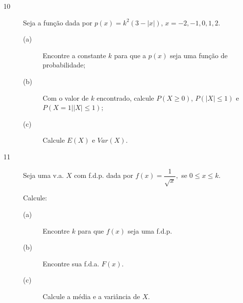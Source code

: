 \documentclass{report}
\begin{document}
\begin{description}

\item[{\large 10}] Seja a função dada por  $p(x)=k^{2}(3-|x|)$, $x = -2, -1, 0, 1, 2.$


\begin{description}

\item[(a)]  Encontre a constante $k$ para que a $p(x)$ seja uma função de probabilidade;

\item[(b)]  Com o valor de $k$ encontrado, calcule   $P(X\geq 0)$, $P(|X|\leq 1)$ e $P(X=1||X|\leq 1)$;

\item[(c)]  Calcule $E(X)$ e $Var(X)$.


\end{description}

\end{description}


\begin{description}

\item[{\large 11}] Seja uma v.a. $X$ com f.d.p. dada por $f(x) = \dfrac{1}{\sqrt{x}},$ se $0\leq x \leq k$.

Calcule:

\begin{description}

\item[(a)]  Encontre $k$ para que $f(x)$ seja uma f.d.p.

\item[(b)]  Encontre sua f.d.a. $F(x)$.

\item[(c)]  Calcule a média e a variância de $X$.

\end{description}

\end{description}
\end{document}
